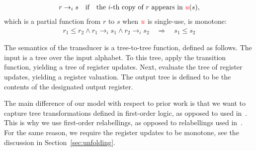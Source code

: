\begin{definition}
\begin{itemize}
\begin{enumerate}
        \begin{align*} 
            r \to_i s \quad \text{if} \quad  \text{the $i$-th copy of $r$ appears in ${\color{red}{u}}(s)$},
        \end{align*}
        which is a partial function from $r$ to $s$ when ${\color{red}{u}}$ is single-use, is monotone:
        \begin{align*}
            r_1 \leq r_2 \land r_1 \to_i s_1  \land  r_2 \to_i s_2  \quad \Rightarrow \quad  s_1 \leq s_2
        \end{align*}
    \end{enumerate}
\end{itemize}
\end{definition}


The semantics of the transducer is  a tree-to-tree function, defined as follows. The input is a tree over the input alphabet. To this tree,  apply the transition function, yielding a tree of register updates. Next, evaluate the tree of register updates, yielding a register valuation. The output tree is defined to be the contents of the designated output register.


The main difference of our model with respect to prior work is that we want to capture  tree transformations defined in first-order logic, as opposed to \mso used in~\cite{bloem_comparison_2000,alurStreamingStringTransducers2011,alur2017streaming}. This is why we use first-order relabellings,  as opposed to \mso relabellings used in~\cite{bloem_comparison_2000}. For the same reason, we require the register updates to be monotone, see the discussion in Section~\ref{sec:unfolding}.  

